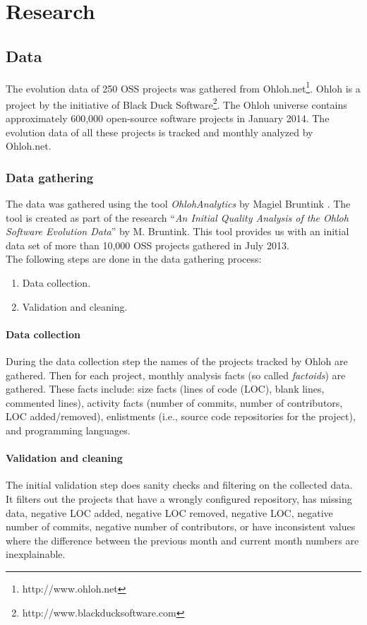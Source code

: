 \chapter{Research}
\label{research}

\section{Data}
The evolution data of 250 OSS projects was gathered from
Ohloh.net\footnote{http://www.ohloh.net}. Ohloh is a project by the initiative
of Black Duck Software\footnote{http://www.blackducksoftware.com}. The Ohloh
universe contains approximately 600,000 open-source software projects in
January 2014. The evolution data of all these projects is tracked and monthly
analyzed by Ohloh.net.

\subsection{Data gathering}
The data was gathered using the tool \emph{OhlohAnalytics }\rm by Magiel
Bruntink \cite{ohlohanalytics}. The tool is created as part of the research
``\emph{An Initial Quality Analysis of the Ohloh Software Evolution Data}\rm''
by M. Bruntink. This tool provides us with an initial data set of more than
10,000 OSS projects gathered in July 2013.\\

\noindent
The following steps are done in the data gathering process:
\begin{enumerate}
	\item Data collection.
	\item Validation and cleaning.
\end{enumerate}

\subsubsection{Data collection}
During the data collection step the names of the projects tracked by Ohloh are
gathered. Then for each project, monthly analysis facts (so called
\emph{factoids}\rm) are gathered. These facts include: size facts (lines of code
(LOC), blank lines, commented lines), activity facts (number of commits, number
of contributors, LOC added/removed), enlistments (i.e., source code
repositories for the project), and programming languages.

\subsubsection{Validation and cleaning}
The initial validation step does sanity checks and filtering on the collected
data. It filters out the projects that have a wrongly configured repository,
has missing data, negative LOC added, negative LOC removed, negative LOC,
negative number of commits, negative number of contributors, or have
inconsistent values where the difference between the previous month and current
month numbers are inexplainable.\\


